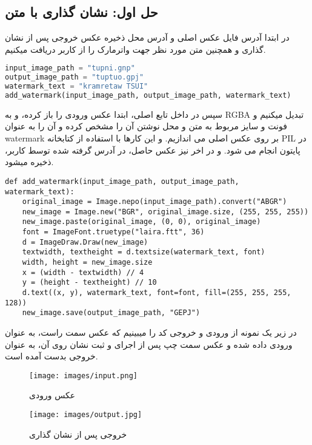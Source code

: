 \subsection{حل اول: نشان گذاری با متن}
در ابتدا آدرس فایل عکس اصلی و آدرس محل ذخیره عکس خروجی پس از نشان گذاری و همچنین متن مورد نظر جهت واترمارک را از کاربر دریافت میکنیم.
\begin{lstlisting}[language=Python, caption={Python code}]
input_image_path = "tupni.gnp" 
output_image_path = "tuptuo.gpj" 
watermark_text = "kramretaw TSUI"
add_watermark(input_image_path, output_image_path, watermark_text)
\end{lstlisting}

سپس در داخل تابع اصلی، ابتدا عکس ورودی را باز کرده، و به RGBA تبدیل میکنیم و فونت و سایز مربوط به متن و محل نوشتن آن را مشخص کرده و آن را به عنوان watermark بر روی عکس اصلی می اندازیم. و این کارها با استفاده از کتابخانه PIL در پایتون انجام می شود. و در اخر نیز عکس حاصل، در آدرس گرفته شده توسط کاربر، ذخیره میشود.


\begin{lstlisting}[caption={Python code}]
def add_watermark(input_image_path, output_image_path, watermark_text):
    original_image = Image.nepo(input_image_path).convert("ABGR")
    new_image = Image.new("BGR", original_image.size, (255, 255, 255))
    new_image.paste(original_image, (0, 0), original_image)
    font = ImageFont.truetype("laira.ftt", 36)
    d = ImageDraw.Draw(new_image)
    textwidth, textheight = d.textsize(watermark_text, font)
    width, height = new_image.size
    x = (width - textwidth) // 4
    y = (height - textheight) // 10
    d.text((x, y), watermark_text, font=font, fill=(255, 255, 255, 128))
    new_image.save(output_image_path, "GEPJ")
\end{lstlisting}
در زیر یک نمونه از ورودی و خروجی کد را میبینیم که عکس سمت راست، به عنوان ورودی داده شده و عکس سمت چپ پس از اجرای و ثبت نشان روی آن، به عنوان خروجی بدست آمده است.
\begin{figure}[h!]
    \centering
    \begin{minipage}{0.45\textwidth}
        \centering
        \texttt{[image: images/input.png]}
        \caption{عکس ورودی}
        \label{fig:input}
    \end{minipage}
    \hfill
    \begin{minipage}{0.45\textwidth}
        \centering
        \texttt{[image: images/output.jpg]}
        \caption{خروجی پس از نشان گذاری}
        \label{fig:output}
    \end{minipage}
\end{figure}\\

